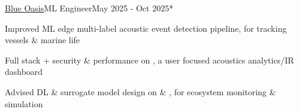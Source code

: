 \documentclass{article}
\begin{document}
\begin{**mylist}{\href{https://blueoasis.pt/}{Blue Oasis}}{ML Engineer}{May 2025 - Oct 2025}*
\item Improved ML edge multi-label acoustic event detection pipeline, for tracking vessels \& marine life
\item Full stack + security \& performance on \href{https://hydrotwin.ai/}{}, a user focused acoustics analytics/IR dashboard
\item Advised DL \& surrogate model design on  \& , for ecosystem monitoring \& simulation
\end{**mylist}
\end{document}
